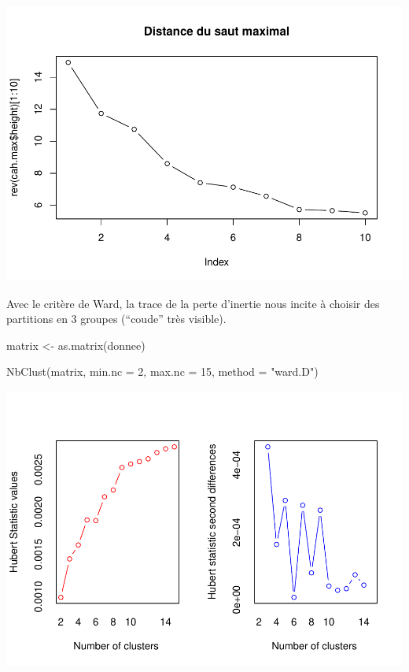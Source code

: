\documentclass[
]{article}
\newenvironment{Shaded}{}{}
\newcommand{\AttributeTok}[1]{#1}
\newcommand{\DecValTok}[1]{#1}
\newcommand{\FunctionTok}[1]{#1}
\newcommand{\NormalTok}[1]{#1}
\newcommand{\OtherTok}[1]{\textcolor[rgb]{1.00,0.25,0.00}{#1}}
\newcommand{\StringTok}[1]{\textcolor[rgb]{0.00,0.50,0.50}{#1}}
\begin{document}
\includegraphics{Projet_files/figure-latex/unnamed-chunk-16-1.pdf}

Avec le critère de Ward, la trace de la perte d'inertie nous incite à
choisir des partitions en 3 groupes (``coude'' très visible).

\begin{Shaded}
\begin{Highlighting}[]
\NormalTok{matrix }\OtherTok{\textless{}{-}} \FunctionTok{as.matrix}\NormalTok{(donnee)}
\end{Highlighting}
\end{Shaded}

\begin{Shaded}
\begin{Highlighting}[]
\FunctionTok{NbClust}\NormalTok{(matrix, }\AttributeTok{min.nc =} \DecValTok{2}\NormalTok{, }\AttributeTok{max.nc =} \DecValTok{15}\NormalTok{, }\AttributeTok{method =} \StringTok{"ward.D"}\NormalTok{)}
\end{Highlighting}
\end{Shaded}

\includegraphics{Projet_files/figure-latex/unnamed-chunk-18-1.pdf}
\end{document}
